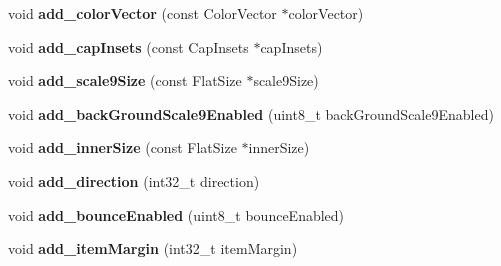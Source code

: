 \begin{DoxyCompactItemize}
\item 
\mbox{\label{structflatbuffers_1_1ListViewOptionsBuilder_a5840b8b9542a2212fbe5c66b19a39059}} 
void {\bfseries add\+\_\+color\+Vector} (const Color\+Vector $\ast$color\+Vector)
\item 
\mbox{\label{structflatbuffers_1_1ListViewOptionsBuilder_a39189d624899aa9078a6f22c8ffaab92}} 
void {\bfseries add\+\_\+cap\+Insets} (const Cap\+Insets $\ast$cap\+Insets)
\item 
\mbox{\label{structflatbuffers_1_1ListViewOptionsBuilder_a55ac4f16142be868534ffdb3bb6745e8}} 
void {\bfseries add\+\_\+scale9\+Size} (const Flat\+Size $\ast$scale9\+Size)
\item 
\mbox{\label{structflatbuffers_1_1ListViewOptionsBuilder_a584b3d7c6d9ebae7c2ff884465aa709d}} 
void {\bfseries add\+\_\+back\+Ground\+Scale9\+Enabled} (uint8\+\_\+t back\+Ground\+Scale9\+Enabled)
\item 
\mbox{\label{structflatbuffers_1_1ListViewOptionsBuilder_a20c92e200476e2de4bc62cddbe439469}} 
void {\bfseries add\+\_\+inner\+Size} (const Flat\+Size $\ast$inner\+Size)
\item 
\mbox{\label{structflatbuffers_1_1ListViewOptionsBuilder_a90a136d0729147e3672dd797ee1940aa}} 
void {\bfseries add\+\_\+direction} (int32\+\_\+t direction)
\item 
\mbox{\label{structflatbuffers_1_1ListViewOptionsBuilder_a7ad66027451c1b04a915db99515c407e}} 
void {\bfseries add\+\_\+bounce\+Enabled} (uint8\+\_\+t bounce\+Enabled)
\item 
\mbox{\label{structflatbuffers_1_1ListViewOptionsBuilder_a7fc583791df1d02173ce810d729bc0b3}} 
void {\bfseries add\+\_\+item\+Margin} (int32\+\_\+t item\+Margin)
\item 
\mbox{\label{structflatbuffers_1_1ListViewOptionsBuilder_a1a75addec5180c6668c79134df3ef248}} 

\end{DoxyCompactItemize}
